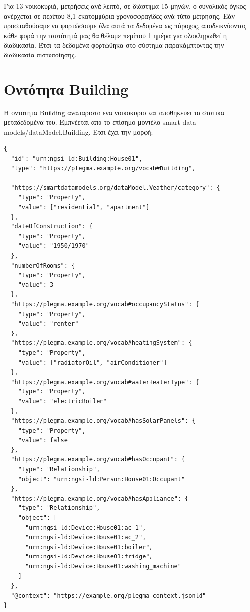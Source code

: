 Για 13 νοικοκυριά, μετρήσεις ανά λεπτό, σε διάστημα 15 μηνών, ο συνολικός
όγκος ανέρχεται σε περίπου 8,1 εκατομμύρια χρονοσφραγίδες ανά τύπο μέτρησης.
Εάν προσπαθούσαμε να φορτώσουμε όλα αυτά τα δεδομένα ως πάροχος, αποδεικνύοντας κάθε φορά την
ταυτότητά μας θα θέλαμε περίπου 1 ημέρα για ολοκληρωθεί η διαδικασία. Έτσι τα δεδομένα 
φορτώθηκα στο σύστημα παρακάμπτοντας την διαδικασία πιστοποίησης.

\section{Οντότητα \textlatin{Building}}
\label{sec:entity-building}

Η οντότητα \textlatin{Building} αναπαριστά ένα νοικοκυριό και αποθηκεύει
τα στατικά μεταδεδομένα του. Εμπνέεται από το επίσημο μοντέλο
\textlatin{smart-data-models/dataModel.Building}. Έτσι έχει την μορφή:

\vspace{0.5cm}
\begin{lstlisting}[language={}, caption={Building entity for House01 in NGSI-LD.}]
{
  "id": "urn:ngsi-ld:Building:House01",
  "type": "https://plegma.example.org/vocab#Building",

  "https://smartdatamodels.org/dataModel.Weather/category": {
    "type": "Property",
    "value": ["residential", "apartment"]
  },
  "dateOfConstruction": {
    "type": "Property",
    "value": "1950/1970"
  },
  "numberOfRooms": {
    "type": "Property",
    "value": 3
  },
  "https://plegma.example.org/vocab#occupancyStatus": {
    "type": "Property",
    "value": "renter"
  },
  "https://plegma.example.org/vocab#heatingSystem": {
    "type": "Property",
    "value": ["radiatorOil", "airConditioner"]
  },
  "https://plegma.example.org/vocab#waterHeaterType": {
    "type": "Property",
    "value": "electricBoiler"
  },
  "https://plegma.example.org/vocab#hasSolarPanels": {
    "type": "Property",
    "value": false
  },
  "https://plegma.example.org/vocab#hasOccupant": {
    "type": "Relationship",
    "object": "urn:ngsi-ld:Person:House01:Occupant"
  },
  "https://plegma.example.org/vocab#hasAppliance": {
    "type": "Relationship",
    "object": [
      "urn:ngsi-ld:Device:House01:ac_1",
      "urn:ngsi-ld:Device:House01:ac_2",
      "urn:ngsi-ld:Device:House01:boiler",
      "urn:ngsi-ld:Device:House01:fridge",
      "urn:ngsi-ld:Device:House01:washing_machine"
    ]
  },
  "@context": "https://example.org/plegma-context.jsonld"
}
\end{lstlisting}

